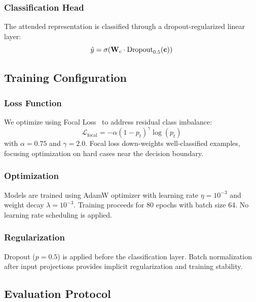 \subsubsection{Classification Head}
The attended representation is classified through a dropout-regularized linear layer:
\begin{equation}
\hat{y} = \sigma(\mathbf{W}_c \cdot \text{Dropout}_{0.5}(\mathbf{c}))
\end{equation}

\subsection{Training Configuration}
\label{subsec:training}

\subsubsection{Loss Function}
We optimize using Focal Loss~\cite{lin2017focal} to address residual class imbalance:
\begin{equation}
\mathcal{L}_\text{focal} = -\alpha (1 - p_t)^\gamma \log(p_t)
\end{equation}
with $\alpha = 0.75$ and $\gamma = 2.0$. Focal loss down-weights well-classified examples, focusing optimization on hard cases near the decision boundary.

\subsubsection{Optimization}
Models are trained using AdamW optimizer with learning rate $\eta = 10^{-3}$ and weight decay $\lambda = 10^{-3}$. Training proceeds for 80 epochs with batch size 64. No learning rate scheduling is applied.

\subsubsection{Regularization}
Dropout ($p=0.5$) is applied before the classification layer. Batch normalization after input projections provides implicit regularization and training stability.

\subsection{Evaluation Protocol}
\label{subsec:evaluation}

